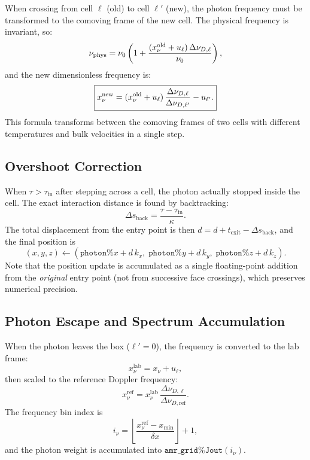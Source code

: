 \documentclass[english,a4paper]{my_memo}
\begin{document}
When crossing from cell $\ell$ (old) to cell $\ell'$ (new), the photon
frequency must be transformed to the comoving frame of the new cell.  The
physical frequency is invariant, so:
\begin{equation}
  \nu_\mathrm{phys} = \nu_0\left(1 + \frac{(x_\nu^{\rm old} + u_\ell)\,\Delta\nu_{D,\ell}}
                                          {\nu_0}\right),
\end{equation}
and the new dimensionless frequency is:
\begin{equation}
  \boxed{
  x_\nu^{\rm new} = (x_\nu^{\rm old} + u_\ell)
                    \,\frac{\Delta\nu_{D,\ell}}{\Delta\nu_{D,\ell'}}
                    - u_{\ell'}.
  }
\end{equation}
This formula transforms between the comoving frames of two cells with
different temperatures and bulk velocities in a single step.

\subsection{Overshoot Correction}
\label{sec:overshoot}

When $\tau > \tau_\mathrm{in}$ after stepping across a cell, the photon
actually stopped inside the cell.  The exact interaction distance is found
by backtracking:
\begin{equation}
  \Delta s_\mathrm{back} = \frac{\tau - \tau_\mathrm{in}}{\kappa}.
\end{equation}
The total displacement from the entry point is then
$d = d + t_\mathrm{exit} - \Delta s_\mathrm{back}$, and the final position is
\begin{equation}
  (x, y, z) \leftarrow (\texttt{photon\%}x + d\,k_x,\;
                         \texttt{photon\%}y + d\,k_y,\;
                         \texttt{photon\%}z + d\,k_z).
\end{equation}
Note that the position update is accumulated as a single floating-point
addition from the \emph{original} entry point (not from successive face crossings),
which preserves numerical precision.

\subsection{Photon Escape and Spectrum Accumulation}

When the photon leaves the box ($\ell' = 0$), the frequency is converted to
the lab frame:
\begin{equation}
  x_\nu^\mathrm{lab} = x_\nu + u_\ell,
\end{equation}
then scaled to the reference Doppler frequency:
\begin{equation}
  x_\nu^\mathrm{ref} = x_\nu^\mathrm{lab}
                       \,\frac{\Delta\nu_{D,\ell}}{\Delta\nu_{D,\mathrm{ref}}}.
\end{equation}
The frequency bin index is
\begin{equation}
  i_\nu = \left\lfloor
    \frac{x_\nu^\mathrm{ref} - x_\mathrm{min}}{\delta x}
  \right\rfloor + 1,
\end{equation}
and the photon weight is accumulated into $\texttt{amr\_grid\%Jout}(i_\nu)$.
\end{document}
